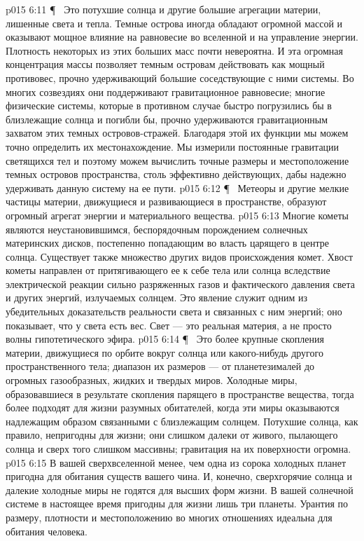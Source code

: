 \vs p015 6:11 \P\  Это потухшие солнца и другие большие агрегации материи, лишенные света и тепла. Темные острова иногда обладают огромной массой и оказывают мощное влияние на равновесие во вселенной и на управление энергии. Плотность некоторых из этих больших масс почти невероятна. И эта огромная концентрация массы позволяет темным островам действовать как мощный противовес, прочно удерживающий большие соседствующие с ними системы. Во многих созвездиях они поддерживают гравитационное равновесие; многие физические системы, которые в противном случае быстро погрузились бы в близлежащие солнца и погибли бы, прочно удерживаются гравитационным захватом этих темных островов\hyp{}стражей. Благодаря этой их функции мы можем точно определить их местонахождение. Мы измерили постоянные гравитации светящихся тел и поэтому можем вычислить точные размеры и местоположение темных островов пространства, столь эффективно действующих, дабы надежно удерживать данную систему на ее пути.
\vs p015 6:12 \P\  Метеоры и другие мелкие частицы материи, движущиеся и развивающиеся в пространстве, образуют огромный агрегат энергии и материального вещества.
\vs p015 6:13 Многие кометы являются неустановившимся, беспорядочным порождением солнечных материнских дисков, постепенно попадающим во власть царящего в центре солнца. Существует также множество других видов происхождения комет. Хвост кометы направлен от притягивающего ее к себе тела или солнца вследствие электрической реакции сильно разряженных газов и фактического давления света и других энергий, излучаемых солнцем. Это явление служит одним из убедительных доказательств реальности света и связанных с ним энергий; оно показывает, что у света есть вес. Свет --- это реальная материя, а не просто волны гипотетического эфира.
\vs p015 6:14 \P\  Это более крупные скопления материи, движущиеся по орбите вокруг солнца или какого\hyp{}нибудь другого пространственного тела; диапазон их размеров --- от планетезималей до огромных газообразных, жидких и твердых миров. Холодные миры, образовавшиеся в результате скопления парящего в пространстве вещества, тогда более подходят для жизни разумных обитателей, когда эти миры оказываются надлежащим образом связанными с близлежащим солнцем. Потухшие солнца, как правило, непригодны для жизни; они слишком далеки от живого, пылающего солнца и сверх того слишком массивны; гравитация на их поверхности огромна.
\vs p015 6:15 В вашей сверхвселенной менее, чем одна из сорока холодных планет пригодна для обитания существ вашего чина. И, конечно, сверхгорячие солнца и далекие холодные миры не годятся для высших форм жизни. В вашей солнечной системе в настоящее время пригодны для жизни лишь три планеты. Урантия по размеру, плотности и местоположению во многих отношениях идеальна для обитания человека.
